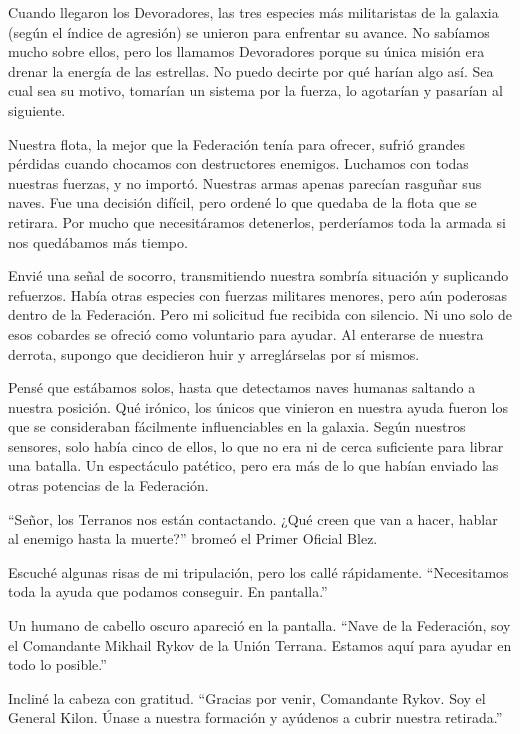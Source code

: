 \documentclass[spanish,12pt,a4paper,oneside,titlepage]{book}
\begin{document}
    Cuando llegaron los Devoradores, las tres especies más militaristas de la galaxia (según el índice de agresión) se unieron para enfrentar su avance. No sabíamos mucho sobre ellos, pero los llamamos Devoradores porque su única misión era drenar la energía de las estrellas. No puedo decirte por qué harían algo así. Sea cual sea su motivo, tomarían un sistema por la fuerza, lo agotarían y pasarían al siguiente.

    Nuestra flota, la mejor que la Federación tenía para ofrecer, sufrió grandes pérdidas cuando chocamos con destructores enemigos. Luchamos con todas nuestras fuerzas, y no importó. Nuestras armas apenas parecían rasguñar sus naves. Fue una decisión difícil, pero ordené lo que quedaba de la flota que se retirara. Por mucho que necesitáramos detenerlos, perderíamos toda la armada si nos quedábamos más tiempo.

    Envié una señal de socorro, transmitiendo nuestra sombría situación y suplicando refuerzos. Había otras especies con fuerzas militares menores, pero aún poderosas dentro de la Federación. Pero mi solicitud fue recibida con silencio. Ni uno solo de esos cobardes se ofreció como voluntario para ayudar. Al enterarse de nuestra derrota, supongo que decidieron huir y arreglárselas por sí mismos.

    Pensé que estábamos solos, hasta que detectamos naves humanas saltando a nuestra posición. Qué irónico, los únicos que vinieron en nuestra ayuda fueron los que se consideraban fácilmente influenciables en la galaxia. Según nuestros sensores, solo había cinco de ellos, lo que no era ni de cerca suficiente para librar una batalla. Un espectáculo patético, pero era más de lo que habían enviado las otras potencias de la Federación.

    ``Señor, los Terranos nos están contactando. ¿Qué creen que van a hacer, hablar al enemigo hasta la muerte?'' bromeó el Primer Oficial Blez.

    Escuché algunas risas de mi tripulación, pero los callé rápidamente. ``Necesitamos toda la ayuda que podamos conseguir. En pantalla.''

    Un humano de cabello oscuro apareció en la pantalla. ``Nave de la Federación, soy el Comandante Mikhail Rykov de la Unión Terrana. Estamos aquí para ayudar en todo lo posible.''

    Incliné la cabeza con gratitud. ``Gracias por venir, Comandante Rykov. Soy el General Kilon. Únase a nuestra formación y ayúdenos a cubrir nuestra retirada.''
\end{document}
